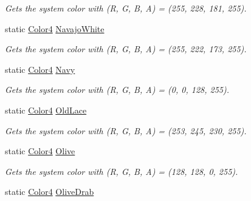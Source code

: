 \begin{DoxyCompactItemize}
\begin{DoxyCompactList}\small\item\em Gets the system color with (R, G, B, A) = (255, 228, 181, 255). \end{DoxyCompactList}\item 
static \hyperlink{struct_open_t_k_1_1_graphics_1_1_color4}{Color4} \hyperlink{struct_open_t_k_1_1_graphics_1_1_color4_a6ef8118bc99d036220f915f9de87deca}{Navajo\-White}
\begin{DoxyCompactList}\small\item\em Gets the system color with (R, G, B, A) = (255, 222, 173, 255). \end{DoxyCompactList}\item 
static \hyperlink{struct_open_t_k_1_1_graphics_1_1_color4}{Color4} \hyperlink{struct_open_t_k_1_1_graphics_1_1_color4_addd7ea5390247d395007bced2dbbd70f}{Navy}
\begin{DoxyCompactList}\small\item\em Gets the system color with (R, G, B, A) = (0, 0, 128, 255). \end{DoxyCompactList}\item 
static \hyperlink{struct_open_t_k_1_1_graphics_1_1_color4}{Color4} \hyperlink{struct_open_t_k_1_1_graphics_1_1_color4_a6efe7d2cfe56be58b481a5981cd69d92}{Old\-Lace}
\begin{DoxyCompactList}\small\item\em Gets the system color with (R, G, B, A) = (253, 245, 230, 255). \end{DoxyCompactList}\item 
static \hyperlink{struct_open_t_k_1_1_graphics_1_1_color4}{Color4} \hyperlink{struct_open_t_k_1_1_graphics_1_1_color4_ab3ed93f84edd164db94b884d602fa140}{Olive}
\begin{DoxyCompactList}\small\item\em Gets the system color with (R, G, B, A) = (128, 128, 0, 255). \end{DoxyCompactList}\item 
static \hyperlink{struct_open_t_k_1_1_graphics_1_1_color4}{Color4} \hyperlink{struct_open_t_k_1_1_graphics_1_1_color4_a72ea3d25e2ba4f10075ba3a55b550db2}{Olive\-Drab}

\end{DoxyCompactItemize}
